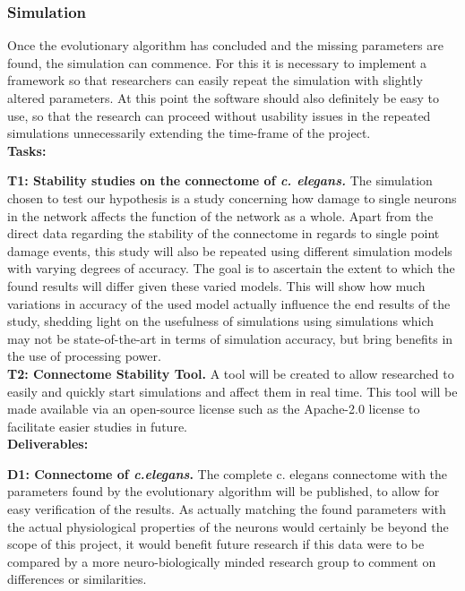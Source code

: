 \documentclass[a4paper,11pt]{article}
\begin{document}
\subsubsection{Simulation}
Once the evolutionary algorithm has concluded and the missing parameters are found, the simulation can commence. For this it is necessary to implement a framework so that researchers can easily repeat the simulation with slightly altered parameters. At this point the software should also definitely be easy to use, so that the research can proceed without usability issues in the repeated simulations unnecessarily extending the time-frame of the project.
\\[0,2cm]

\textbf{Tasks:}

\textbf{T1: Stability studies on the connectome of \emph{c. elegans.}}
The simulation chosen to test our hypothesis is a study concerning how damage to single neurons in the network affects the function of the network as a whole.
Apart from the direct data regarding the stability of the connectome in regards to single point damage events, this study will also be repeated using different simulation models with varying degrees of accuracy. The goal is to ascertain the extent to which the found results will differ given these varied models. This will show how much variations in accuracy of the used model actually influence the end results of the study, shedding light on the usefulness of simulations using simulations which may not be state-of-the-art in terms of simulation accuracy, but bring benefits in the use of processing power. 
\\[0,2cm]

\textbf{T2: Connectome Stability Tool.}
A tool will be created to allow researched to easily and quickly start simulations and affect them in real time. This tool will be made available via an open-source license such as the Apache-2.0 license to facilitate easier studies in future.
\\[0,2cm]

\textbf{Deliverables:} 

\textbf{D1: Connectome of \emph{c.elegans}.}
The complete c. elegans connectome with the parameters found by the evolutionary algorithm will be published, to allow for easy verification of the results. As actually matching the found parameters with the actual physiological properties of the neurons would certainly be beyond the scope of this project, it would benefit future research if this data were to be compared by a more neuro-biologically minded research group to comment on differences or similarities. 
\end{document}

